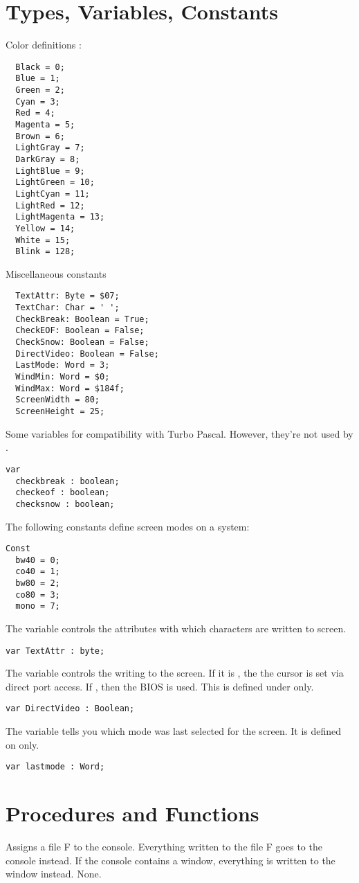 \section{Types, Variables, Constants}
Color definitions :
\begin{verbatim}
  Black = 0;
  Blue = 1;
  Green = 2;
  Cyan = 3;
  Red = 4;
  Magenta = 5;
  Brown = 6;
  LightGray = 7;
  DarkGray = 8;
  LightBlue = 9;
  LightGreen = 10;
  LightCyan = 11;
  LightRed = 12;
  LightMagenta = 13;
  Yellow = 14;
  White = 15;
  Blink = 128;
\end{verbatim}
Miscellaneous constants
\begin{verbatim}
  TextAttr: Byte = $07;
  TextChar: Char = ' ';
  CheckBreak: Boolean = True;
  CheckEOF: Boolean = False;
  CheckSnow: Boolean = False;
  DirectVideo: Boolean = False;
  LastMode: Word = 3;
  WindMin: Word = $0;
  WindMax: Word = $184f;
  ScreenWidth = 80;
  ScreenHeight = 25;
\end{verbatim}
Some variables for compatibility with Turbo Pascal. However, they're not
used by \fpk.
\begin{verbatim}
var
  checkbreak : boolean;
  checkeof : boolean;
  checksnow : boolean;
\end{verbatim}
The following constants define screen modes on a \dos system:
\begin{verbatim}
Const
  bw40 = 0;
  co40 = 1;
  bw80 = 2;
  co80 = 3;
  mono = 7;
\end{verbatim}
The  variable controls the attributes with which characters
are written to screen.
\begin{verbatim}
var TextAttr : byte;
\end{verbatim}
The  variable controls the writing to the screen. If it is
, the the cursor is set via direct port access. If ,
then the BIOS is used. This is defined under \dos only.
\begin{verbatim}
var DirectVideo : Boolean;
\end{verbatim}
The  variable tells you which mode was last selected for the
screen. It is defined on \dos only.
\begin{verbatim}
var lastmode : Word;
\end{verbatim}

\section{Procedures and Functions}
{
Assigns a file F to the console. Everything written to the file F goes to
the console instead. If the console contains a window, everything is written
to the window instead.
}
{None.}{}

